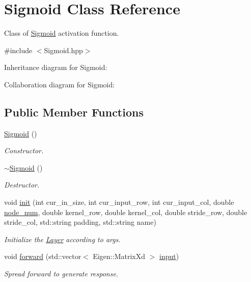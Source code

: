 \hypertarget{class_sigmoid}{}\section{Sigmoid Class Reference}
\label{class_sigmoid}


Class of \hyperlink{class_sigmoid}{Sigmoid} activation function.  




{\ttfamily \#include $<$Sigmoid.\+hpp$>$}



Inheritance diagram for Sigmoid\+:


Collaboration diagram for Sigmoid\+:
\subsection*{Public Member Functions}
\begin{DoxyCompactItemize}
\item 
\hyperlink{class_sigmoid_af871f2160541f3aa75558900cae467ba}{Sigmoid} ()
\begin{DoxyCompactList}\small\item\em Constructor. \end{DoxyCompactList}\item 
\hyperlink{class_sigmoid_a88d0c24dd37b6a90ee7607b5329ab60b}{$\sim$\+Sigmoid} ()
\begin{DoxyCompactList}\small\item\em Destructor. \end{DoxyCompactList}\item 
void \hyperlink{class_sigmoid_af70d4bfe6e3f507457067fc801256928}{init} (int cur\+\_\+in\+\_\+size, int cur\+\_\+input\+\_\+row, int cur\+\_\+input\+\_\+col, double \hyperlink{class_layer_a2f19878482d098654fb084b9c21b72ed}{node\+\_\+num}, double kernel\+\_\+row, double kernel\+\_\+col, double stride\+\_\+row, double stride\+\_\+col, std\+::string padding, std\+::string name)
\begin{DoxyCompactList}\small\item\em Initialize the \hyperlink{class_layer}{Layer} according to args. \end{DoxyCompactList}\item 
void \hyperlink{class_sigmoid_adc63e77cbdcd74d1d4c452514a173c69}{forward} (std\+::vector$<$ Eigen\+::\+Matrix\+Xd $>$ \hyperlink{class_layer_a5213366d9a5a7317c5d40d9efdcfa623}{input})
\begin{DoxyCompactList}\small\item\em Spread forward to generate response. \end{DoxyCompactList}\end{DoxyCompactItemize}
